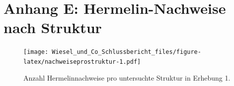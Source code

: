 \documentclass[
]{scrbook}
\begin{document}
\hypertarget{anhang-e-hermelin-nachweise-nach-struktur}{%
\section{Anhang E: Hermelin-Nachweise nach Struktur}\label{anhang-e-hermelin-nachweise-nach-struktur}}



\begin{figure}
\centering
\texttt{[image: Wiesel\_und\_Co\_Schlussbericht\_files/figure-latex/nachweiseprostruktur-1.pdf]}
\caption{\label{fig:nachweiseprostruktur}Anzahl Hermelinnachweise pro untersuchte Struktur in Erhebung 1.}
\end{figure}
\end{document}
